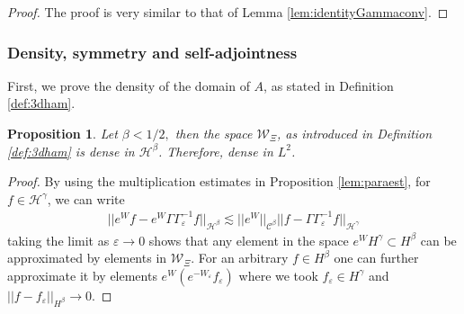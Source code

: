 \documentclass[11pt, oneside]{article}   	%
\newtheorem{proposition}[theorem]{Proposition}
\begin{document}
\begin{proof}
The proof is very similar to that of Lemma \ref{lem:identityGammaconv}.
\end{proof}

\subsubsection{Density, symmetry and self-adjointness}

First, we prove the density of the domain of $A$, as stated in Definition \ref{def:3dham}.

\begin{proposition} \label{prop:3ddensity}
	Let $\beta<1/2,$ then the space $\mathscr{W}_\Xi$, as introduced in Definition \ref{def:3dham} is dense in $\mathscr{H}^\beta$.  Therefore, dense in $L^2$.
\end{proposition}

\begin{proof}
By using the multiplication estimates in Proposition \ref{lem:paraest}, for $f \in \mathscr{H}^\gamma$, we can write
\begin{align*}
|| e^{W} f  - e^{W} \Gamma \Gamma_\varepsilon^{-1} f||_{\mathscr{H}^\beta} \lesssim ||e^W||_{\mathscr{C}^{\beta}} ||f  -  \Gamma \Gamma_\varepsilon^{-1} f||_{\mathscr{H}^\gamma} 
\end{align*}
taking the limit as $\varepsilon \rightarrow 0$ shows that any element in the space $e^{W} H^{\gamma} \subset H^{\beta}$ can be approximated by elements in $\mathscr{W}_\Xi$.  For an arbitrary $f \in H^{\beta}$ one can further approximate it by elements $e^{W}(e^{-W_\varepsilon}f_\varepsilon)$ where we took $f_\varepsilon \in H^{\gamma}$ and   $||f - f_\varepsilon||_{H^{\beta}} \rightarrow 0$.
\end{proof}
\end{document}
